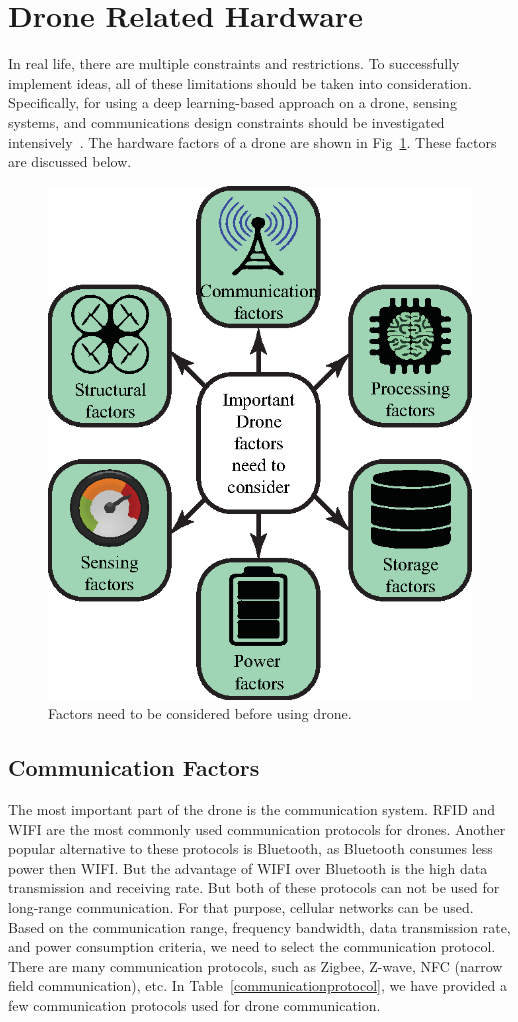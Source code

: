 \section{Drone Related Hardware}
\label{toolkitsection}
In real life, there are multiple constraints and restrictions. To successfully implement ideas, all of these limitations should be taken into consideration. Specifically, for using a deep learning-based approach on a drone, sensing systems, and communications design constraints should be investigated intensively~\cite{fraga2019review}. The hardware factors of a drone are shown in Fig~\ref{hardware}. These factors are discussed below.
\begin{figure}[h!]
\centering
\includegraphics[width=.7\linewidth]{figure/hardware.eps}
\caption{Factors need to be considered before using drone.}
\label{hardware}
\end{figure}
\subsection{Communication Factors}
The most important part of the drone is the communication system. RFID and WIFI are the most commonly used communication protocols for drones. Another popular alternative to these protocols is Bluetooth, as Bluetooth consumes less power then WIFI. But the advantage of WIFI over Bluetooth is the high data transmission and receiving rate. But both of these protocols can not be used for long-range communication. For that purpose, cellular networks can be used. Based on the communication range, frequency bandwidth, data transmission rate, and power consumption criteria, we need to select the communication protocol. There are many communication protocols, such as Zigbee, Z-wave, NFC (narrow field communication), etc. In Table~\ref{communicationprotocol}, we have provided a few communication protocols used for drone communication.


